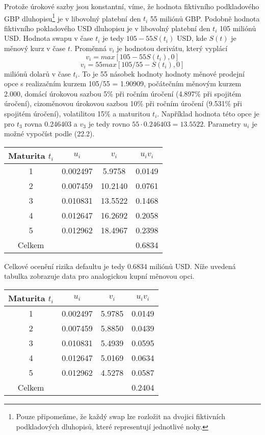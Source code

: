 \documentclass[a4paper]{book}
\begin{document}
Protože úrokové sazby jsou konstantní, víme, že hodnota fiktivního podkladového GBP dluhopisu\footnote{Pouze připomeňme, že každý swap lze rozložit na dvojici fiktivních podkladových dluhopisů, které representují jednotlivé nohy.} je v libovolný platební den  $t_i$ 55 miliónů GBP. Podobně hodnota fiktivního pokladového USD dluhopisu je v libovolný platební den $t_i$ 105 miliónů USD. Hodnota swapu v čase $t_i$ je tedy $105 - 55S(t_i)$ USD, kde $S(t)$ je měnový kurz v čase $t$. Proměnná $v_i$ je hodnotou derivátu, který vyplácí
\begin{equation*}
v_i = max[105-55S(t_i),0]
\end{equation*}
\begin{equation*}
v_i = 55 max[105/55 - S(t_i),0]
\end{equation*}
miliónů dolarů v čase $t_i$. To je 55 násobek hodnoty hodnoty měnové prodejní opce s realizačním kurzem 105/55 = 1.90909, počátečním měnovým kurzem 2.000, domácí úrokovou sazbou 5\% při ročním úročení (4.897\% při spojitém úročení), cizoměnovou úrokovou sazbou 10\% při ročním úročení (9.531\% při spojitém úročení), volatilitou 15\% a maturitou $t_i$. Například hodnota této opce je pro $t_3$ rovna 0.246403 a $v_3$ je tedy rovno $55 \cdot 0.246403 = 13.5522$. Parametry $u_i$ je možné vypočíst podle (22.2).
\begin{center}
\begin{tabular}{c c c c}
\textbf{Maturita $t_i$} &
\textbf{$u_i$} &
\textbf{$v_i$} &
\textbf{$u_i v_i$} \\
\hline
1 & 0.002497 &  5.9758 & 0.0149 \\
2 & 0.007459 & 10.2140 & 0.0761 \\
3 & 0.010831 & 13.5522 & 0.1468 \\
4 & 0.012647 & 16.2692 & 0.2058 \\
5 & 0.012962 & 18.4967 & 0.2398 \\
\hline
Celkem & & & 0.6834 \\
\hline
\end{tabular}
\end{center}
Celkové ocenění rizika defaultu je tedy 0.6834 miliónů USD. Níže uvedená tabulka zobrazuje data pro analogickou kupní měnovou opci.
\begin{center}
\begin{tabular}{c c c c}
\textbf{Maturita $t_i$} &
\textbf{$u_i$} &
\textbf{$v_i$} &
\textbf{$u_i v_i$} \\
\hline
1 & 0.002497 & 5.9785 & 0.0149 \\
2 & 0.007459 & 5.8850 & 0.0439 \\
3 & 0.010831 & 5.4939 & 0.0595 \\
4 & 0.012647 & 5.0169 & 0.0634 \\
5 & 0.012962 & 4.5278 & 0.0587 \\
\hline
Celkem & & & 0.2404 \\
\hline
\end{tabular}
\end{center}
\end{document}
